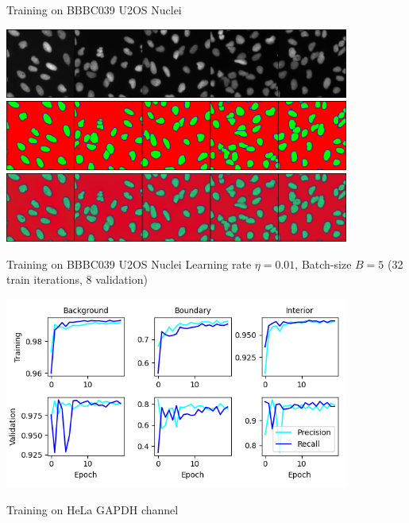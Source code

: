 \documentclass[aspectratio=1610]{beamer}					%
\begin{document}
\begin{frame}{Training on BBBC039 U2OS Nuclei}

\begin{center}
\includegraphics[width=0.85\textwidth]{input-train.png}
\includegraphics[width=0.85\textwidth]{target-train.png}
\includegraphics[width=0.85\textwidth]{output-train.png}
\end{center}

\end{frame}

\begin{frame}{Training on BBBC039 U2OS Nuclei}
Learning rate $\eta=0.01$, Batch-size $B=5$ (32 train iterations, 8 validation)
\begin{center}
\includegraphics[width=0.85\textwidth]{metrics.png}
\end{center}

\end{frame}

\begin{frame}{Training on HeLa GAPDH channel}

\end{frame}
\end{document}
